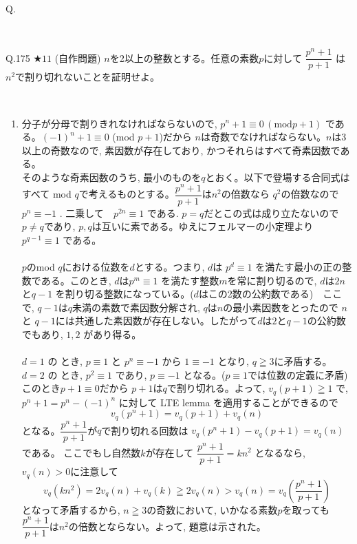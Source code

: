 \documentclass[twocolumn]{jsarticle}
\newcommand{\thm}{\begin{itembox}[l]}
\newcommand{\enthm}{\end{itembox}\\}
\renewcommand{\geq}{\geqq}
\begin{document}
\thm{Q.}
\enthm



\thm{Q.175 $\bigstar 11$ (自作問題)}
$n$を2以上の整数とする。任意の素数$p$に対して $\dfrac{p^n+1}{p+1}$ は$n^2$で割り切れないことを証明せよ。
\enthm
\begin{enumerate}
\item[] 分子が分母で割りきれなければならないので, $p^n+1\equiv 0 \, (\mbox{mod} p+1)$ である。$(-1)^n+1\equiv 0$ (mod  $p+1$)だから $n$は奇数でなければならない。$n$は3以上の奇数なので, 素因数が存在しており, かつそれらはすべて奇素因数である。\\
そのような奇素因数のうち, 最小のものを$q$とおく。以下で登場する合同式はすべて mod $q$で考えるものとする。$\dfrac{p^n+1}{p+1}$は$n^2$の倍数なら $q^2$の倍数なので $p^n\equiv -1$ . 二乗して　$p^{2n}\equiv 1$  である. $p=q$だとこの式は成り立たないので $p\neq q$であり, $p,q$は互いに素である。ゆえにフェルマーの小定理より $p^{q-1}\equiv 1$ である。\\
\\
$p$のmod $q$における位数を$d$とする。つまり, $d$は $p^d\equiv 1$ を満たす最小の正の整数である。このとき, $d$は$p^m\equiv 1$  を満たす整数$m$を常に割り切るので, $d$は$2n$と$q-1$ を割り切る整数になっている。($d$はこの2数の公約数である)　ここで, $q-1$は$q$未満の素数で素因数分解され, $q$は$n$の最小素因数をとったので $n$ と $q-1$には共通した素因数が存在しない。したがって$d$は$2$と$q-1$の公約数でもあり, $1,2$ があり得る。\\
\\
$d=1$ の とき, $p\equiv 1$ と $p^n\equiv -1$ から $1\equiv -1$ となり, $q\geq 3$に矛盾する。\\
$d=2$ の とき, $p^2\equiv 1$ であり,  $p\equiv -1$ となる。($p\equiv 1$では位数の定義に矛盾)\\
このとき$p+1\equiv 0$だから $p+1$は$q$で割り切れる。よって, $v_{q}(p+1)\geq 1$ で, $p^n+1=p^n-(-1)^n$ に対して LTE lemma を適用することができるので
\[v_q(p^n+1)=v_q(p+1)+v_q(n)\]
となる。$\dfrac{p^n+1}{p+1}$が$q$で割り切れる回数は $v_q{(p^n+1)}-v_q(p+1)=v_q(n)$ である。 ここでもし自然数$k$が存在して $\dfrac{p^n+1}{p+1}=kn^2$ となるなら, $v_q(n)>0$に注意して
\[v_q(kn^2)=2v_q(n)+v_q(k)\geq 2v_q(n)>v_q(n)=v_q\left(\dfrac{p^n+1}{p+1}\right)\]
となって矛盾するから, $n\geq 3$の奇数において, いかなる素数$p$を取っても $\dfrac{p^n+1}{p+1}$は$n^2$の倍数とならない。よって, 題意は示された。
\end{enumerate}
\end{document}
